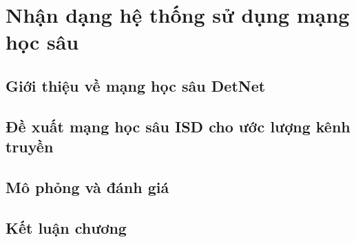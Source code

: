 \clearpage
{}

\setcounter{chapter}{2}
\chapter[NHẬN DẠNG HỆ THỐNG SỬ DỤNG MẠNG HỌC SÂU]{Nhận dạng hệ thống sử dụng mạng học sâu}
\label{sec:ML}

\section{Giới thiệu về mạng học sâu DetNet}

\section{Đề xuất mạng học sâu ISD cho ước lượng kênh truyền}

\section{Mô phỏng và đánh giá}

\section{Kết luận chương}